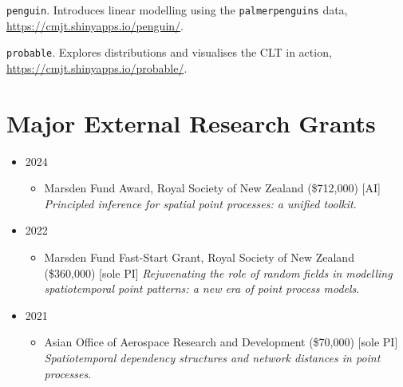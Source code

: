 \documentclass[10pt,a4paper]{moderncv}
\begin{document}
\texttt{penguin}. Introduces linear modelling using the \texttt{palmerpenguins} data, \url{https://cmjt.shinyapps.io/penguin/}.\\

\vspace{-3pt}

\texttt{probable}. Explores distributions and visualises the CLT in action, \url{https://cmjt.shinyapps.io/probable/}.\\

\newpage
\section{Major External Research Grants}

\vspace{6pt}
\begin{itemize}
  \item 2024
  \begin{itemize}
  \item Marsden Fund Award, Royal Society of New Zealand (\$712,000) [AI] \textit{Principled inference for spatial point processes: a unified toolkit}. 
  \end{itemize}
\item 2022
  \begin{itemize}
  \item Marsden Fund Fast-Start Grant, Royal Society of New Zealand (\$360,000) [sole PI] \textit{Rejuvenating the role of random fields in modelling spatiotemporal point patterns: a new era of point process models}.
  \end{itemize}
\item 2021
  \begin{itemize}
  \item Asian Office of Aerospace Research and Development (\$70,000) [sole PI] \textit{Spatiotemporal dependency structures and network distances in point processes}.

\end{itemize}
\end{itemize}
\end{document}
